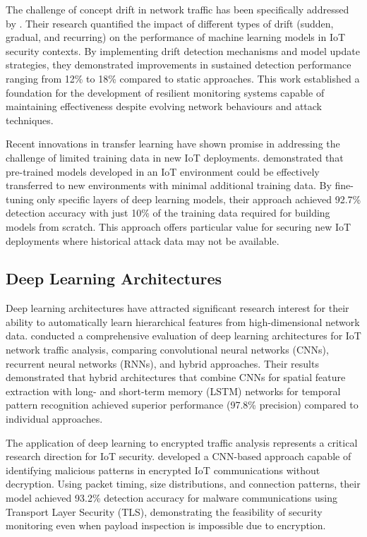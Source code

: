 The challenge of concept drift in network traffic has been specifically addressed by \cite{Sethi2019}. Their research quantified the impact of different types of drift (sudden, gradual, and recurring) on the performance of machine learning models in IoT security contexts. By implementing drift detection mechanisms and model update strategies, they demonstrated improvements in sustained detection performance ranging from 12\% to 18\% compared to static approaches. This work established a foundation for the development of resilient monitoring systems capable of maintaining effectiveness despite evolving network behaviours and attack techniques.

Recent innovations in transfer learning have shown promise in addressing the challenge of limited training data in new IoT deployments. \cite{Liu2021} demonstrated that pre-trained models developed in an IoT environment could be effectively transferred to new environments with minimal additional training data. By fine-tuning only specific layers of deep learning models, their approach achieved 92.7\% detection accuracy with just 10\% of the training data required for building models from scratch. This approach offers particular value for securing new IoT deployments where historical attack data may not be available.

\subsection{Deep Learning Architectures}

Deep learning architectures have attracted significant research interest for their ability to automatically learn hierarchical features from high-dimensional network data. \cite{Lopez-Martin2020} conducted a comprehensive evaluation of deep learning architectures for IoT network traffic analysis, comparing convolutional neural networks (CNNs), recurrent neural networks (RNNs), and hybrid approaches. Their results demonstrated that hybrid architectures that combine CNNs for spatial feature extraction with long- and short-term memory (LSTM) networks for temporal pattern recognition achieved superior performance (97.8\% precision) compared to individual approaches.

The application of deep learning to encrypted traffic analysis represents a critical research direction for IoT security. \cite{Wang2019} developed a CNN-based approach capable of identifying malicious patterns in encrypted IoT communications without decryption. Using packet timing, size distributions, and connection patterns, their model achieved 93.2\% detection accuracy for malware communications using Transport Layer Security (TLS), demonstrating the feasibility of security monitoring even when payload inspection is impossible due to encryption.

